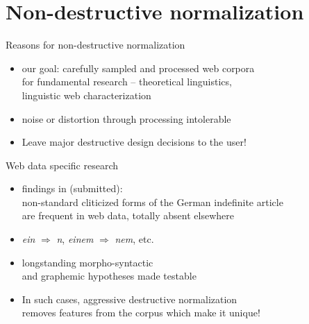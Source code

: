 \section{Non-destructive normalization}

\begin{frame}
  {Reasons for non-destructive normalization}
  \begin{itemize}
    \item our goal: carefully sampled and processed web corpora\\
      for fundamental research -- theoretical linguistics,\\
      linguistic web characterization
    \item \alert{noise or distortion through processing intolerable}
    \item \alert{Leave major destructive design decisions to the user!}
  \end{itemize}
\end{frame}

\begin{frame}
  {Web data specific research}
  \begin{itemize}
    \item findings in \citeauthor{SchaeferSayatz2013} (submitted):\\
      non-standard cliticized forms of the German indefinite article\\
      are frequent in web data, totally absent elsewhere
    \item \textit{ein} $\Rightarrow$ \textit{n}, \textit{einem} $\Rightarrow$ \textit{nem}, etc.
    \item longstanding morpho-syntactic\\
      and graphemic hypotheses made testable
    \item \alert{In such cases, aggressive destructive normalization\\
      removes features from the corpus which make it unique!}
  \end{itemize}
\end{frame}


